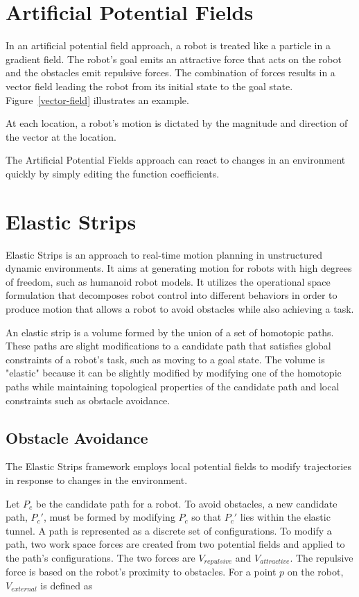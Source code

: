 \documentclass[10pt,conference]{ieeeconf}
\begin{document}
\section{Artificial Potential Fields}

In an artificial potential field approach, a robot is treated like a particle in a gradient field. The robot's goal emits an attractive force that acts on the robot and the obstacles emit repulsive forces. The combination of forces results in a vector field leading the robot from its initial state to the goal state. Figure~\ref{vector-field} illustrates an example.

At each location, a robot's motion is dictated by the magnitude and direction of the vector at the location.

The Artificial Potential Fields approach can react to changes in an environment quickly by simply editing the function coefficients.

\section{Elastic Strips}

Elastic Strips \cite{brock2002elastic} is an approach to real-time motion planning in unstructured dynamic environments. It aims at generating motion for robots with high degrees of freedom, such as humanoid robot models. It utilizes the operational space formulation \cite{khatib1987unified} that decomposes robot control into different behaviors in order to produce motion that allows a robot to avoid obstacles while also achieving a task. 

An elastic strip is a volume formed by the union of a set of homotopic paths. These paths are slight modifications to a candidate path that satisfies global constraints of a robot's task, such as moving to a goal state. The volume is "elastic" because it can be slightly modified by modifying one of the homotopic paths while maintaining topological properties of the candidate path and local constraints such as obstacle avoidance. 

\subsection{Obstacle Avoidance}

The Elastic Strips framework employs local potential fields to modify trajectories in response to changes in the environment. 

Let $P_c$ be the candidate path for a robot. To avoid obstacles, a new candidate path, $P_c'$, must be formed by modifying $P_c$ so that $P_c'$ lies within the elastic tunnel. A path is represented as a discrete set of configurations. To modify a path, two work space forces are created from two potential fields and applied to the path's configurations. The two forces are $V_{repulsive}$ and $V_{attractive}$. The repulsive force is based on the robot's proximity to obstacles. For a point $p$ on the robot, $V_{external}$ is defined as
\end{document}
